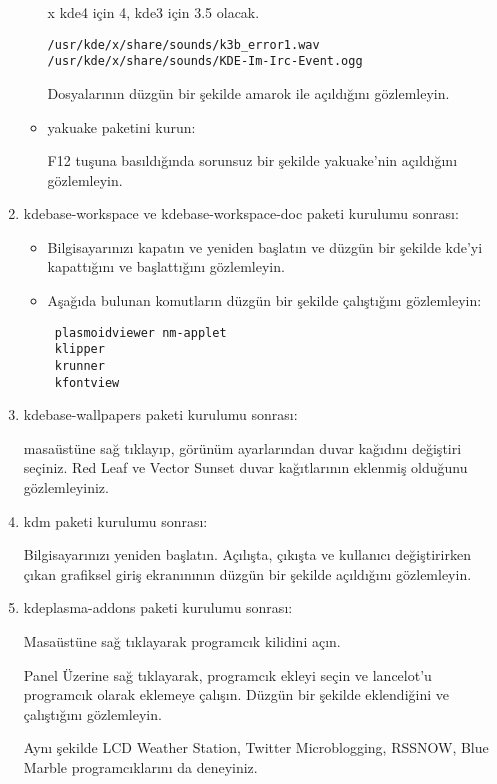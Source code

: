 \documentclass[a4paper,10pt]{article}
\begin{document}
\begin{enumerate}
\begin{itemize}
x kde4 için 4, kde3 için 3.5 olacak.
\begin{verbatim}
/usr/kde/x/share/sounds/k3b_error1.wav
/usr/kde/x/share/sounds/KDE-Im-Irc-Event.ogg
\end{verbatim}

Dosyalarının düzgün bir şekilde amarok ile açıldığını gözlemleyin.

\item yakuake paketini kurun:

F12 tuşuna basıldığında sorunsuz bir şekilde yakuake'nin açıldığını gözlemleyin.
\end{itemize}
\item kdebase-workspace ve kdebase-workspace-doc paketi kurulumu sonrası:
\begin{itemize}

 \item Bilgisayarınızı kapatın ve yeniden başlatın ve düzgün bir şekilde kde'yi kapattığını ve başlattığını gözlemleyin.

 \item Aşağıda bulunan komutların düzgün bir şekilde çalıştığını gözlemleyin:
\begin{verbatim}
 plasmoidviewer nm-applet 
 klipper
 krunner
 kfontview
\end{verbatim}

\end{itemize}

\item kdebase-wallpapers paketi kurulumu sonrası:

masaüstüne sağ tıklayıp, görünüm ayarlarından duvar kağıdını değiştiri seçiniz. Red Leaf ve Vector Sunset duvar kağıtlarının eklenmiş olduğunu gözlemleyiniz.

\item kdm paketi kurulumu sonrası:

Bilgisayarınızı yeniden başlatın. Açılışta, çıkışta ve kullanıcı değiştirirken çıkan grafiksel giriş ekranınının düzgün bir şekilde açıldığını gözlemleyin.

\item kdeplasma-addons paketi kurulumu sonrası:

Masaüstüne sağ tıklayarak programcık kilidini açın.

Panel Üzerine sağ tıklayarak, programcık ekleyi seçin ve lancelot'u programcık olarak eklemeye çalışın. Düzgün bir şekilde eklendiğini ve çalıştığını gözlemleyin.

Aynı şekilde LCD Weather Station, Twitter Microblogging, RSSNOW, Blue Marble programcıklarını da deneyiniz.


\end{enumerate}
\end{document}
